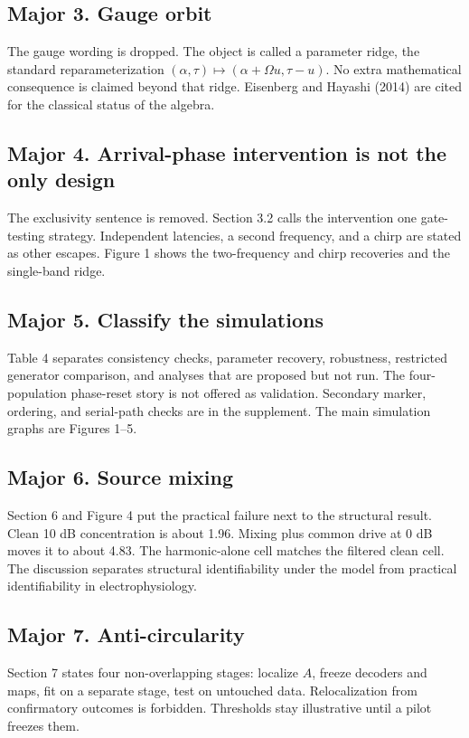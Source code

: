 \documentclass[11pt]{article}
\begin{document}
\subsection*{Major 3. Gauge orbit}
The gauge wording is dropped. The object is called a parameter ridge, the standard reparameterization \((\alpha,\tau)\mapsto(\alpha+\Omega u,\tau-u)\). No extra mathematical consequence is claimed beyond that ridge. Eisenberg and Hayashi (2014) are cited for the classical status of the algebra.

\subsection*{Major 4. Arrival-phase intervention is not the only design}
The exclusivity sentence is removed. Section 3.2 calls the intervention one gate-testing strategy. Independent latencies, a second frequency, and a chirp are stated as other escapes. Figure 1 shows the two-frequency and chirp recoveries and the single-band ridge.

\subsection*{Major 5. Classify the simulations}
Table 4 separates consistency checks, parameter recovery, robustness, restricted generator comparison, and analyses that are proposed but not run. The four-population phase-reset story is not offered as validation. Secondary marker, ordering, and serial-path checks are in the supplement. The main simulation graphs are Figures 1--5.

\subsection*{Major 6. Source mixing}
Section 6 and Figure 4 put the practical failure next to the structural result. Clean 10 dB concentration is about 1.96. Mixing plus common drive at 0 dB moves it to about 4.83. The harmonic-alone cell matches the filtered clean cell. The discussion separates structural identifiability under the model from practical identifiability in electrophysiology.

\subsection*{Major 7. Anti-circularity}
Section 7 states four non-overlapping stages: localize \(A\), freeze decoders and maps, fit on a separate stage, test on untouched data. Relocalization from confirmatory outcomes is forbidden. Thresholds stay illustrative until a pilot freezes them.
\end{document}
